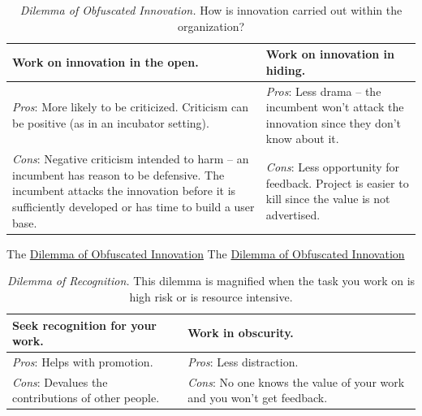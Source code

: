 \begin{center}
\begin{table}[H] %
\begin{tabular}{ | m{\dilemmatablewidth}| m{\dilemmatablewidth} | } 
  \hline
  \textbf{Work on innovation in the open.} &
  \textbf{Work on innovation in hiding.} \\
  \hline
  \textit{Pros}: More likely to be criticized. Criticism can be positive (as in an incubator setting).& 
  \textit{Pros}: Less drama -- the incumbent won't attack the innovation since they don't know about it. \\
  \hline
  \textit{Cons}: Negative criticism intended to harm -- an incumbent has reason to be defensive. The incumbent attacks the innovation before it is sufficiently developed or has time to build a user base. & 
  \textit{Cons}: Less opportunity for feedback. Project is easier to kill since the value is not advertised.\\
  \hline
\end{tabular}
\caption{
\textit{Dilemma of Obfuscated Innovation.}
How is innovation carried out within the organization?
}
\label{table:innovate-open-obscure}
\end{table}
\end{center}

The \href{table:innovate-open-obscure}{Dilemma of Obfuscated Innovation}
The \href{table:innovate-open-obscure}{Dilemma of Obfuscated Innovation}


\begin{center}
\begin{table}[H] %
\begin{tabular}{ | m{\dilemmatablewidth}| m{\dilemmatablewidth} | } 
  \hline
  \textbf{Seek recognition for your work.} &
  \textbf{Work in obscurity.} \\
  \hline
  \textit{Pros}: Helps with promotion. & 
  \textit{Pros}: Less distraction. \\
  \hline
  \textit{Cons}: Devalues the contributions of other people. & 
  \textit{Cons}: No one knows the value of your work and you won't get feedback. \\
  \hline
\end{tabular}
\caption{
\textit{Dilemma of Recognition.}
This dilemma is magnified when the task you work on is high risk or is resource intensive. 
}
\label{table:recognition-obscurity}
\end{table}
\end{center}

